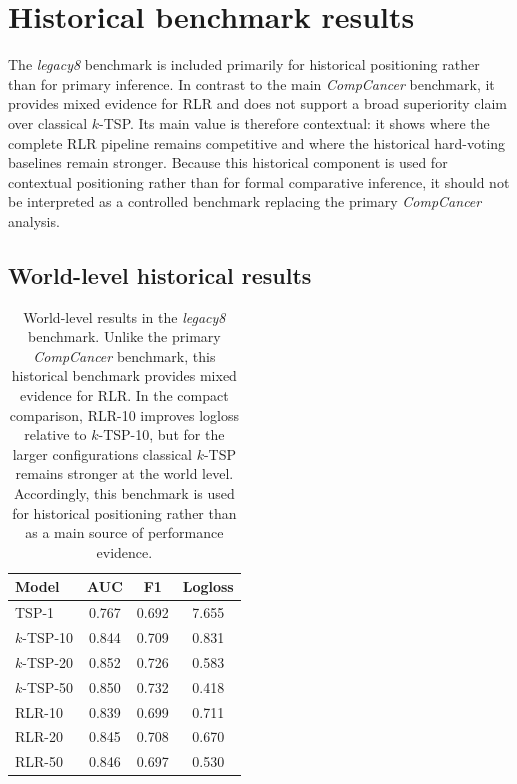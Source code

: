 \documentclass[11pt, a4paper]{article}
\newcommand{\stdtablefont}{\small}
\newcommand{\stdtablelayout}{%
  \stdtablefont
  \setlength{\tabcolsep}{4pt}
  \renewcommand{\arraystretch}{1.2}
}
\begin{document}

\section{Historical benchmark results}

The \emph{legacy8} benchmark is included primarily for historical positioning rather than for primary inference. In contrast to the main \emph{CompCancer} benchmark, it provides mixed evidence for RLR and does not support a broad superiority claim over classical $k$-TSP. Its main value is therefore contextual: it shows where the complete RLR pipeline remains competitive and where the historical hard-voting baselines remain stronger. Because this historical component is used for contextual positioning rather than for formal comparative inference, it should not be interpreted as a controlled benchmark replacing the primary \emph{CompCancer} analysis.

\subsection{World-level historical results}

\begin{table}[!htbp]
\centering
\caption{World-level results in the \emph{legacy8} benchmark. Unlike the primary \emph{CompCancer} benchmark, this historical benchmark provides mixed evidence for RLR. In the compact comparison, RLR-10 improves logloss relative to $k$-TSP-10, but for the larger configurations classical $k$-TSP remains stronger at the world level. Accordingly, this benchmark is used for historical positioning rather than as a main source of performance evidence.}
\label{tab:legacy_world}
{\stdtablelayout
\begin{tabular}{lccc}
\toprule
\textbf{Model} & \textbf{AUC} & \textbf{F1} & \textbf{Logloss} \\
\midrule
TSP-1      & 0.767 & 0.692 & 7.655 \\
$k$-TSP-10 & 0.844 & 0.709 & 0.831 \\
$k$-TSP-20 & 0.852 & 0.726 & 0.583 \\
$k$-TSP-50 & 0.850 & 0.732 & 0.418 \\
RLR-10     & 0.839 & 0.699 & 0.711 \\
RLR-20     & 0.845 & 0.708 & 0.670 \\
RLR-50     & 0.846 & 0.697 & 0.530 \\
\bottomrule
\end{tabular}
}
\end{table}
\end{document}
